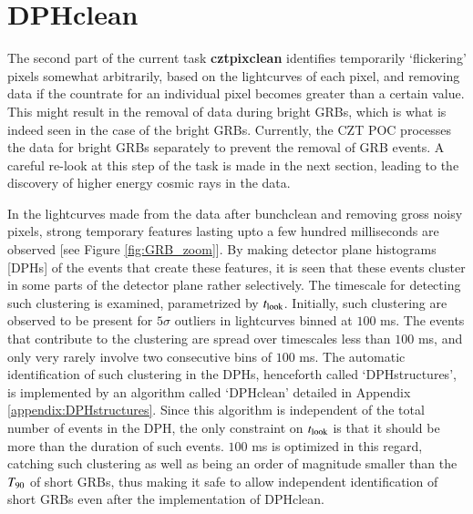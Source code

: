 \section{DPHclean}
\label{sec:DPHclean}
The second part of the current task \textbf{cztpixclean} identifies temporarily `flickering' pixels somewhat arbitrarily, based on the lightcurves of each pixel, and removing data if the countrate for an individual pixel becomes greater than a certain value. This might result in the removal of data during bright GRBs, which is what is indeed seen in the case of the bright GRBs. Currently, the CZT POC processes the data for bright GRBs separately to prevent the removal of GRB events. A careful re-look at this step of the task is made in the next section, leading to the discovery of higher energy cosmic rays in the data.

In the lightcurves made from the data after bunchclean and removing gross noisy pixels, strong temporary features lasting upto a few hundred milliseconds are observed [see Figure \ref{fig:GRB_zoom}]. By making detector plane histograms [DPHs] of the events that create these features, it is seen that these events cluster in some parts of the detector plane rather selectively. The timescale for detecting such clustering is examined, parametrized by $t_{{\rm look}}$. Initially, such clustering are observed to be present for $5 \sigma$ outliers in lightcurves binned at $100$ ms. The events that contribute to the clustering are spread over timescales less than $100$ ms, and only very rarely involve two consecutive bins of $100$ ms. The automatic identification of such clustering in the DPHs, henceforth called `DPHstructures', is implemented by an algorithm called `DPHclean' detailed in Appendix \ref{appendix:DPHstructures}. Since this algorithm is independent of the total number of events in the DPH, the only constraint on $t_{{\rm look}}$ is that it should be more than the duration of such events. $100$ ms is optimized in this regard, catching such clustering as well as being an order of magnitude smaller than the $T_{\rm{90}}$ of short GRBs, thus making it safe to allow independent identification of short GRBs even after the implementation of DPHclean.


